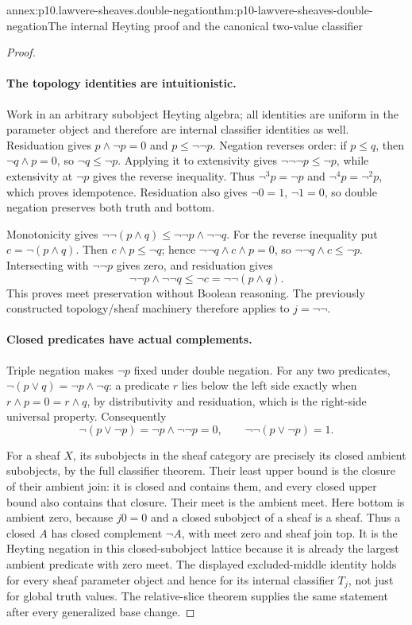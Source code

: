 \begin{annexitem}{annex:p10.lawvere-sheaves.double-negation}{thm:p10-lawvere-sheaves-double-negation}{The internal Heyting proof and the canonical two-value classifier}
\begin{proof}
\paragraph{The topology identities are intuitionistic.}
Work in an arbitrary subobject Heyting algebra; all identities
are uniform in the parameter object and therefore are internal
classifier identities as well.  Residuation gives
\(p\land\neg p=0\) and \(p\leq\neg\neg p\).
Negation reverses order: if \(p\leq q\), then
\(\neg q\land p=0\), so \(\neg q\leq\neg p\).
Applying it to extensivity gives
\(\neg\neg\neg p\leq\neg p\), while extensivity
at \(\neg p\) gives the reverse inequality.  Thus
\(\neg^3p=\neg p\) and \(\neg^4p=\neg^2p\),
which proves idempotence.  Residuation also gives
\(\neg0=1\), \(\neg1=0\), so double negation
preserves both truth and bottom.

Monotonicity gives
\(\neg\neg(p\land q)\leq\neg\neg p\land\neg\neg q\).
For the reverse inequality put \(c=\neg(p\land q)\).
Then \(c\land p\leq\neg q\); hence
\(\neg\neg q\land c\land p=0\), so
\(\neg\neg q\land c\leq\neg p\).
Intersecting with \(\neg\neg p\) gives zero,
and residuation gives
\[
       \neg\neg p\land\neg\neg q\leq\neg c
                                      =\neg\neg(p\land q).
\]
This proves meet preservation without Boolean reasoning.
The previously constructed topology/sheaf machinery therefore
applies to \(j=\neg\neg\).

\paragraph{Closed predicates have actual complements.}
Triple negation makes \(\neg p\) fixed under double
negation.  For any two predicates,
\(\neg(p\lor q)=\neg p\land\neg q\): a predicate
\(r\) lies below the left side exactly when
\(r\land p=0=r\land q\), by distributivity and
residuation, which is the right-side universal property.
Consequently
\[
       \neg(p\lor\neg p)=\neg p\land\neg\neg p=0,
       \qquad \neg\neg(p\lor\neg p)=1.
\]

For a sheaf \(X\), its subobjects in the sheaf category
are precisely its closed ambient subobjects, by the full
classifier theorem.  Their least upper bound is the closure
of their ambient join: it is closed and contains them, and
every closed upper bound also contains that closure.
Their meet is the ambient meet.  Here bottom is ambient
zero, because \(j0=0\) and a closed subobject of a sheaf
is a sheaf.  Thus a closed \(A\) has closed complement
\(\neg A\), with meet zero and sheaf join top.
It is the Heyting negation in this closed-subobject lattice
because it is already the largest ambient predicate with
zero meet.  The displayed excluded-middle identity holds
for every sheaf parameter object and hence for its internal
classifier \(T_j\), not just for global truth values.
The relative-slice theorem supplies the same statement
after every generalized base change.


\end{proof}
\end{annexitem}
